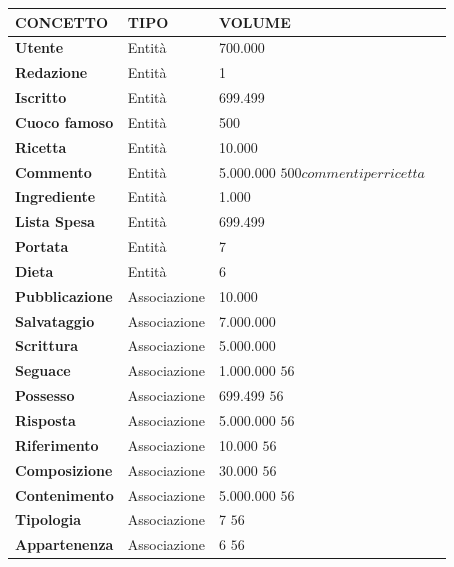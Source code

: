\documentclass[12pt]{extarticle}
\begin{document}
\vspace{2cm}
    \begin{tabularx}{\textwidth}{X|X|X|X}
    \bfseries CONCETTO     & \bfseries TIPO  & \bfseries VOLUME \\ 
    \hline\hline
    \bfseries Utente        & Entità        & 700.000       \\ 
    \hline
    \bfseries Redazione     & Entità        & 1             \\
    \hline
    \bfseries Iscritto      & Entità        & 699.499       \\
    \hline
    \bfseries Cuoco famoso  & Entità        & 500           \\
    \hline
    \bfseries Ricetta       & Entità        & 10.000        \\
    \hline
    \bfseries Commento      & Entità        & 5.000.000    $500 commenti per ricetta$\\
    \hline
    \bfseries Ingrediente   & Entità        & 1.000         \\
    \hline
    \bfseries Lista Spesa   & Entità        & 699.499       \\
    \hline
    \bfseries Portata       & Entità        & 7             \\
    \hline
    \bfseries Dieta         & Entità        & 6             \\
    \hline
    \bfseries Pubblicazione & Associazione  & 10.000        \\
    \hline
    \bfseries Salvataggio   & Associazione  & 7.000.000     \\
    \hline
    \bfseries Scrittura     & Associazione  & 5.000.000     \\
    \hline
    \bfseries Seguace       & Associazione  & 1.000.000     $56$\\
    \hline
    \bfseries Possesso      & Associazione  & 699.499       $56$\\
    \hline
    \bfseries Risposta      & Associazione  & 5.000.000     $56$\\
    \hline
    \bfseries Riferimento   & Associazione  & 10.000        $56$\\
    \hline
    \bfseries Composizione  & Associazione  & 30.000        $56$\\
    \hline
    \bfseries Contenimento  & Associazione  & 5.000.000     $56$\\
    \hline
    \bfseries Tipologia     & Associazione  & 7             $56$\\
    \hline
    \bfseries Appartenenza  & Associazione  & 6             $56$\\
    \hline
    \end{tabularx}
\end{document}
